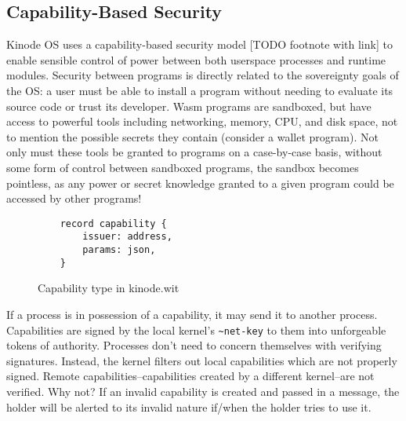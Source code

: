 \documentclass[runningheads]{llncs}
\begin{document}
\subsection{Capability-Based Security}

Kinode OS uses a capability-based security model [TODO footnote with link] to enable sensible control of power between both userspace processes and runtime modules.
Security between programs is directly related to the sovereignty goals of the OS: a user must be able to install a program without needing to evaluate its source code or trust its developer.
Wasm programs are sandboxed, but have access to powerful tools including networking, memory, CPU, and disk space, not to mention the possible secrets they contain (consider a wallet program).
Not only must these tools be granted to programs on a case-by-case basis, without some form of control between sandboxed programs, the sandbox becomes pointless, as any power or secret knowledge granted to a given program could be accessed by other programs!

\begin{figure}[H]
    \centering
    \begin{lstlisting}
    record capability {
        issuer: address,
        params: json,
    }
    \end{lstlisting}
    \caption{Capability type in kinode.wit}
    \label{fig:WIT Types 3}
\end{figure}

If a process is in possession of a capability, it may send it to another process.
Capabilities are signed by the local kernel's \verb|~net-key| to  them into unforgeable tokens of authority.
Processes don't need to concern themselves with verifying signatures.
Instead, the kernel filters out local capabilities which are not properly signed.
Remote capabilities–capabilities created by a different kernel–are not verified.
Why not?
If an invalid capability is created and passed in a message, the holder will be alerted to its invalid nature if/when the holder tries to use it.
\end{document}
